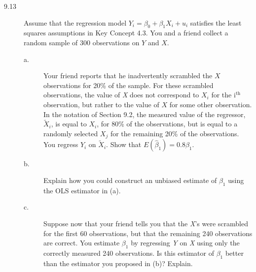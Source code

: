 \documentclass[a4paper,11pt]{article}
\begin{document}
\begin{description}
\item[{9.13}] Assume that the regression model \(Y_i = \beta_0 + \beta_1
          X_i + u_i\) satisfies the least squares assumptions in Key
Concept 4.3. You and a friend collect a random sample of 300
observations on \(Y\) and \(X\).
\begin{description}
\item[{a.}] Your friend reports that he inadvertently scrambled the \(X\)
observations for 20\% of the sample. For these scrambled
observations, the value of \emph{X} does not correspond to \(X_i\)
for the i\(^{\text{th}}\) observation, but rather to the value of \(X\)
for some other observation. In the notation of Section 9.2,
the measured value of the regressor, \(\tilde{X}_i\), is equal
to \(X_i\), for 80\% of the observations, but is equal to a
randomly selected \(X_j\) for the remaining 20\% of the
observations. You regress \(Y_i\) on \(\tilde{X}_i\). Show that
\(E(\hat{\beta}_1) = 0.8\beta_1\).
\item[{b.}] Explain how you could construct an unbiased estimate of
\(\beta_1\) using the OLS estimator in (a).
\item[{c.}] Suppose now that your friend tells you that the \emph{X}'s were
scrambled for the first 60 observations, but that the
remaining 240 observations are correct. You estimate
\(\beta_1\) by regressing \emph{Y} on \emph{X} using only the correctly
measured 240 observations. Is this estimator of \(\beta_1\)
better than the estimator you proposed in (b)? Explain.
\end{description}
\end{description}
\end{document}
